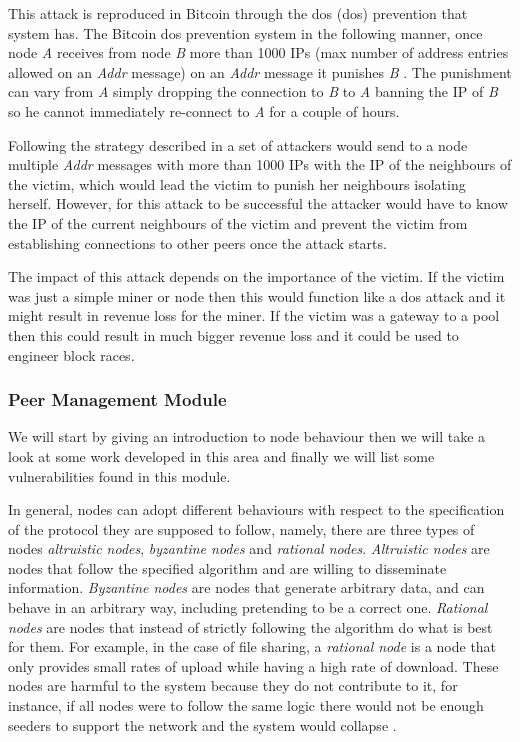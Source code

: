 This attack is reproduced in Bitcoin through the \acrlong{dos} (\acrshort{dos}) prevention that system has. The Bitcoin \acrshort{dos} prevention system in the following manner, once node \textit{A} receives from node \textit{B} more than 1000 IPs (max number of address entries allowed on an \textit{Addr} message) on an \textit{Addr} message it punishes \textit{B} \cite{bitcoinwiki}. The punishment can vary from \textit{A} simply dropping the connection to \textit{B} to \textit{A} banning the IP of \textit{B} so he cannot immediately re-connect to \textit{A} for a couple of hours.

Following the strategy described in \cite{jesi2009secure} a set of attackers would send to a node multiple \textit{Addr} messages with more than 1000 IPs with the IP of the neighbours of the victim, which would lead the victim to punish her neighbours isolating herself. However, for this attack to be successful the attacker would have to know the IP of the current neighbours of the victim and prevent the victim from establishing connections to other peers once the attack starts.

The impact of this attack depends on the importance of the victim. If the victim was just a simple miner or node then this would function like a \acrshort{dos} attack and it might result in revenue loss for the miner. If the victim was a gateway to a pool then this could result in much bigger revenue loss and it could be used to engineer block races.


\subsubsection{Peer Management Module}
\label{sec:peer_management_module}
We will start by giving an introduction to node behaviour then we will take a look at some work developed in this area and finally we will list some vulnerabilities found in this module.

In general, nodes can adopt different behaviours with respect to the specification of the protocol they are supposed to follow, namely, there are three types of nodes \textit{altruistic nodes},  \textit{byzantine nodes} and \textit{rational nodes}. \textit{Altruistic nodes} are nodes that follow the specified algorithm and are willing to disseminate information. \textit{Byzantine nodes} are nodes that generate arbitrary data, and can behave in an arbitrary way, including pretending to be a correct one. \textit{Rational nodes} are nodes that instead of strictly following the algorithm do what is best for them. For example, in the case of file sharing, a \textit{rational node} is a node that only provides small rates of upload while having a high rate of download. These nodes are harmful to the system because they do not contribute to it, for instance, if all nodes were to follow the same logic there would not be enough seeders to support the network and the system would collapse \cite{li2006bar} \cite{cohen2003incentives}.

